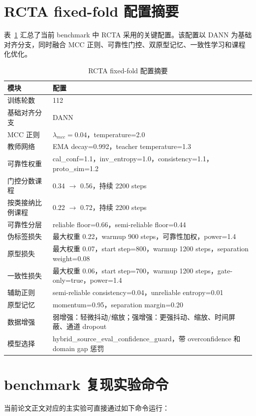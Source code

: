 \section{RCTA fixed-fold 配置摘要}
表~\ref{tab:appendix-rcta-hparams} 汇总了当前 benchmark 中 RCTA 采用的关键配置。该配置以 DANN 为基础对齐分支，同时融合 MCC 正则、可靠性门控、双原型记忆、一致性学习和课程化优化。

\begin{table}[htbp]
\centering
\caption{RCTA fixed-fold 配置摘要}
\label{tab:appendix-rcta-hparams}
\scriptsize
\begin{tabular}{l p{9.2cm}}
\hline
模块 & 配置 \\
\hline
训练轮数 & 112 \\
基础对齐分支 & DANN \\
MCC 正则 & $\lambda_{mcc}=0.04$，temperature=2.0 \\
教师网络 & EMA decay=0.992，teacher temperature=1.3 \\
可靠性权重 & cal\_conf=1.1，inv\_entropy=1.0，consistency=1.1，proto\_sim=1.2 \\
门控分数课程 & 0.34 $\rightarrow$ 0.56，持续 2200 steps \\
按类接纳比例课程 & 0.22 $\rightarrow$ 0.72，持续 2200 steps \\
可靠性分层 & reliable floor=0.66，semi-reliable floor=0.44 \\
伪标签损失 & 最大权重 0.22，warmup 900 steps，可靠性加权，power=1.4 \\
原型损失 & 最大权重 0.07，start step=800，warmup 1200 steps，separation weight=0.08 \\
一致性损失 & 最大权重 0.06，start step=700，warmup 1200 steps，gate-only=true，power=1.4 \\
辅助正则 & semi-reliable consistency=0.04，unreliable entropy=0.01 \\
原型记忆 & momentum=0.95，separation margin=0.20 \\
数据增强 & 弱增强：轻微抖动/缩放；强增强：更强抖动、缩放、时间屏蔽、通道 dropout \\
模型选择 & hybrid\_source\_eval\_confidence\_guard，带 overconfidence 和 domain gap 惩罚 \\
\hline
\end{tabular}
\normalsize
\end{table}

\section{benchmark 复现实验命令}
当前论文正文对应的主实验可直接通过如下命令运行：

